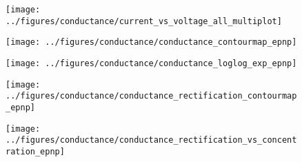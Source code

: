 \begin{figure*}[!htb]
  \centering

  \begin{minipage}[l]{16cm}
    \begin{minipage}[h]{5cm}
      \begin{subfigure}[t]{4.5cm}
        \centering
        \caption{}\vspace{-3mm}\label{fig:current-voltage_curves}
        \texttt{[image: ../figures/conductance/current\_vs\_voltage\_all\_multiplot]}
      \end{subfigure}
    \end{minipage}
    \begin{minipage}[r]{11cm}
      \begin{minipage}[h]{10.5cm}
        \begin{subfigure}[t]{5cm}
          \centering
          \caption{}\vspace{-5mm}\label{fig:conductance_contourmap_epnp}
          \texttt{[image: ../figures/conductance/conductance\_contourmap\_epnp]}
        \end{subfigure}
        \begin{subfigure}[t]{5cm}
          \centering
          \caption{}\vspace{-5mm}\label{fig:conductance_loglog_exp_epnp}
          \texttt{[image: ../figures/conductance/conductance\_loglog\_exp\_epnp]}
        \end{subfigure}
      \end{minipage}
      \vspace{5mm}
      \begin{minipage}[h]{10.5cm}
        \begin{subfigure}[t]{5cm}
          \centering
          \caption{}\vspace{-5mm}\label{fig:conductance_rectification_contourmap_epnp}
          \texttt{[image: ../figures/conductance/conductance\_rectification\_contourmap\_epnp]}
        \end{subfigure}
        \begin{subfigure}[t]{5cm}
          \centering
          \caption{}\vspace{-5mm}\label{fig:conductance_rectification_vs_concentration_epnp}
          \texttt{[image: ../figures/conductance/conductance\_rectification\_vs\_concentration\_epnp]}
        \end{subfigure}

\end{minipage}
\end{minipage}
\end{minipage}
\end{figure*}
